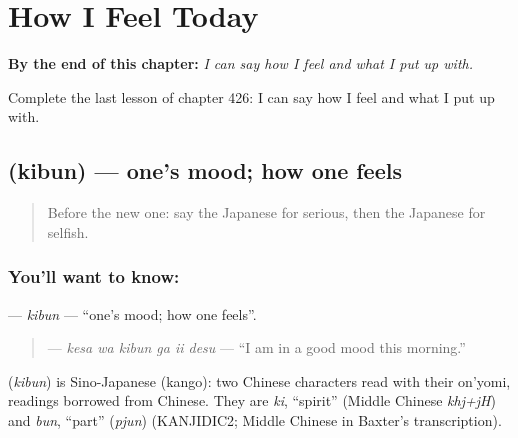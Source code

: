 
\chapter{How I Feel Today}
\label{ch:ja-how-i-feel-today}

\begin{chapteropening}
\textbf{By the end of this chapter:} \emph{I can say how I feel and what I put up with.}

Complete the last lesson of chapter 426: I can say how I feel and what I put up with.
\end{chapteropening}

\section[\texorpdfstring{\ja{きぶん} (kibun)}{きぶん (kibun)}]{ (kibun) — one's mood; how one feels}

\label{lesson:JA-C426-kibun}



\begin{quote}
Before the new one: say the Japanese for serious, then the Japanese for selfish.
\end{quote}

\subsection*{You'll want to know: }
\textbf{} — \emph{kibun} — \textquotedblleft{}one's mood; how one feels\textquotedblright{}.

\begin{quote}
\textbf{  } — \emph{kesa wa kibun ga ii desu} — \textquotedblleft{}I am in a good mood this morning.\textquotedblright{}
\end{quote}

\begin{cousinweb}
\textbf{} (\emph{kibun}) is Sino-Japanese (kango): two Chinese characters read with their on'yomi, readings borrowed from Chinese. They are \emph{ki}, \textquotedblleft{}spirit\textquotedblright{} (Middle Chinese \emph{khj+jH}) and \emph{bun}, \textquotedblleft{}part\textquotedblright{} (\emph{pjun}) (KANJIDIC2; Middle Chinese in Baxter's transcription).
\end{cousinweb}

